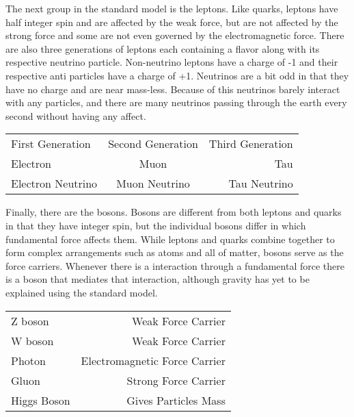 \documentclass
[]
{thesis}
\begin{document}
The next group in the standard model is the leptons. Like quarks, leptons have half integer spin and are affected by the weak force, but are not affected by the strong force and some are not even governed by the electromagnetic force. There are also three generations of leptons each containing a flavor along with its respective neutrino particle. Non-neutrino leptons have a charge of -1 and their respective anti particles have a charge of +1. Neutrinos are a bit odd in that they have no charge and are near mass-less. Because of this neutrinos barely interact with any particles, and there are many neutrinos passing through the earth every second without having any affect.

\begin{center}
\begin{tabular}{l c r}
	First Generation & Second Generation & Third Generation \\
	Electron & Muon & Tau \\
	Electron Neutrino & Muon Neutrino & Tau Neutrino \\
\end{tabular}
\end{center}

Finally, there are the bosons. Bosons are different from both leptons and quarks in that they have integer spin, but the individual bosons differ in which fundamental force affects them. While leptons and quarks combine together to form complex arrangements such as atoms and all of matter, bosons serve as the force carriers. Whenever there is a interaction through a fundamental force there is a boson that mediates that interaction, although gravity has yet to be explained using the standard model.
 
\begin{center}
\begin{tabular}{l r}
	Z boson & Weak Force Carrier \\
	W boson & Weak Force Carrier \\
	Photon & Electromagnetic Force Carrier \\
	Gluon & Strong Force Carrier \\
	Higgs Boson & Gives Particles Mass \\
\end{tabular}
\end{center}
\end{document}
